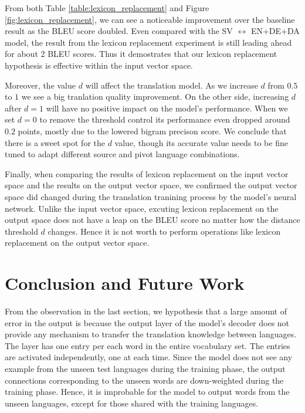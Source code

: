 \documentclass[thesis,fonts=libertine]{cluu}
\begin{document}
From both Table \ref{table:lexicon_replacement} and Figure \ref{fig:lexicon_replacement}, we can see a noticeable improvement over the baseline result as the BLEU score doubled. Even compared with the SV $\leftrightarrow$ EN+DE+DA model, the result from the lexicon replacement experiment is still leading ahead for about 2 BLEU scores. Thus it demostrates that our lexicon replacement hypothesis is effective within the input vector space.

Moreover, the value $d$ will affect the translation model. As we increase $d$ from $0.5$ to $1$ we see a big tranlation quality improvement. On the other side, increasing $d$ after $d=1$ will have no positive impact on the model's performance. When we set $d=0$ to remove the threshold control its performance even dropped around $0.2$ points, mostly due to the lowered bigram precison score. We conclude that there is a sweet spot for the $d$ value, though its accurate value needs to be fine tuned to adapt different source and pivot language combinations.

Finally, when comparing the results of lexicon replacement on the input vector space and the results on the output vector space, we confirmed the output vector space did changed during the translation tranining process by the model's neural network. Unlike the input vector space, excuting lexicon replacement on the output space does not have a leap on the BLEU score no matter how the distance threshold $d$ changes. Hence it is not worth to perform operations like lexicon replacement on the output vector space.

\chapter{Conclusion and Future Work}
\label{chap:conclusion}

From the observation in the last section, we hypothesis that a large amount of error in the output is because the output layer of the model's decoder does not provide any mechanism to transfer the translation knowledge between languages. The layer has one entry per each word in the entire vocabulary set. The entries are activated independently, one at each time. Since the model does not see any example from the unseen test languages during the training phase, the output connections corresponding to the unseen words are down-weighted during the training phase. Hence, it is improbable for the model to output words from the unseen languages, except for those shared with the training languages.
\end{document}
